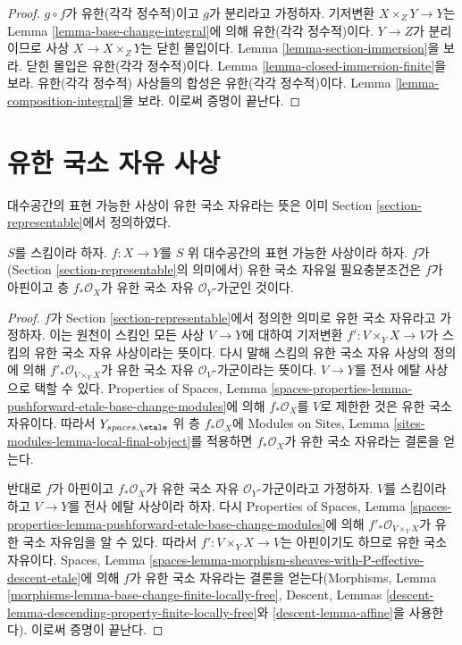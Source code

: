 \begin{proof}
$g \circ f$가 유한(각각 정수적)이고 $g$가 분리라고 가정하자.
기저변환 $X \times_Z Y \to Y$는 Lemma
\ref{lemma-base-change-integral}에 의해 유한(각각 정수적)이다.
$Y \to Z$가 분리이므로 사상 $X \to X \times_Z Y$는 닫힌 몰입이다.
Lemma \ref{lemma-section-immersion}을 보라.
닫힌 몰입은 유한(각각 정수적)이다. Lemma
\ref{lemma-closed-immersion-finite}을 보라.
유한(각각 정수적) 사상들의 합성은 유한(각각 정수적)이다. Lemma
\ref{lemma-composition-integral}을 보라. 이로써 증명이 끝난다.
\end{proof}





\section{유한 국소 자유 사상}
\label{section-finite-locally-free}

\noindent
대수공간의 표현 가능한 사상이 유한 국소 자유라는 뜻은 이미 Section
\ref{section-representable}에서 정의하였다.

\begin{lemma}
\label{lemma-finite-locally-free-representable}
$S$를 스킴이라 하자. $f : X \to Y$를 $S$ 위 대수공간의 표현 가능한
사상이라 하자. $f$가 (Section \ref{section-representable}의 의미에서)
유한 국소 자유일 필요충분조건은 $f$가 아핀이고 층
$f_*\mathcal{O}_X$가 유한 국소 자유 $\mathcal{O}_Y$-가군인 것이다.
\end{lemma}

\begin{proof}
$f$가 Section \ref{section-representable}에서 정의한 의미로 유한 국소
자유라고 가정하자. 이는 원천이 스킴인 모든 사상 $V \to Y$에 대하여
기저변환 $f' : V \times_Y X \to V$가 스킴의 유한 국소 자유 사상이라는
뜻이다. 다시 말해 스킴의 유한 국소 자유 사상의 정의에 의해
$f'_*\mathcal{O}_{V \times_Y X}$가 유한 국소 자유
$\mathcal{O}_V$-가군이라는 뜻이다. $V \to Y$를 전사 에탈 사상으로
택할 수 있다. Properties of Spaces, Lemma
\ref{spaces-properties-lemma-pushforward-etale-base-change-modules}에 의해
$f_*\mathcal{O}_X$를 $V$로 제한한 것은 유한 국소 자유이다. 따라서
$Y_{spaces, \etale}$ 위 층 $f_*\mathcal{O}_X$에 Modules on Sites, Lemma
\ref{sites-modules-lemma-local-final-object}를 적용하면
$f_*\mathcal{O}_X$가 유한 국소 자유라는 결론을 얻는다.

\medskip\noindent
반대로 $f$가 아핀이고 $f_*\mathcal{O}_X$가 유한 국소 자유
$\mathcal{O}_Y$-가군이라고 가정하자. $V$를 스킴이라 하고
$V \to Y$를 전사 에탈 사상이라 하자. 다시 Properties of Spaces,
Lemma \ref{spaces-properties-lemma-pushforward-etale-base-change-modules}에
의해 $f'_*\mathcal{O}_{V \times_Y X}$가 유한 국소 자유임을 알 수 있다.
따라서 $f' : V \times_Y X \to V$는 아핀이기도 하므로 유한 국소 자유이다.
Spaces, Lemma
\ref{spaces-lemma-morphism-sheaves-with-P-effective-descent-etale}에 의해
$f$가 유한 국소 자유라는 결론을 얻는다(Morphisms, Lemma
\ref{morphisms-lemma-base-change-finite-locally-free}, Descent, Lemmas
\ref{descent-lemma-descending-property-finite-locally-free}와
\ref{descent-lemma-affine}을 사용한다). 이로써 증명이 끝난다.
\end{proof}

